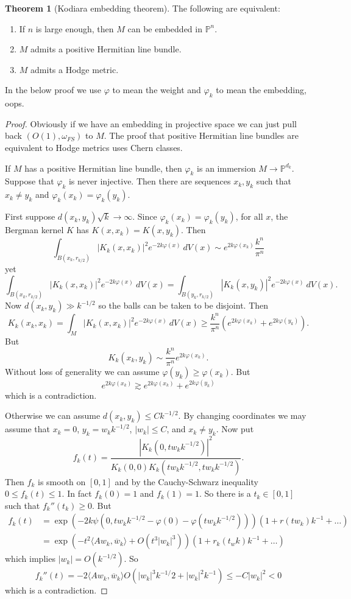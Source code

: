 \documentclass[12pt]{report}
\newcommand{\PP}{\mathbb{P}}
\theoremstyle{definition}
\newtheorem{theorem}{Theorem}[chapter]
\begin{document}
\begin{theorem}[Kodiara embedding theorem]
    The following are equivalent:
\begin{enumerate}
    \item If $n$ is large enough, then $M$ can be embedded in $\PP^n$.
    \item $M$ admits a positive Hermitian line bundle.
    \item $M$ admits a Hodge metric.
\end{enumerate}
\end{theorem}
    In the below proof we use $\varphi$ to mean the weight and $\varphi_k$ to mean the embedding, oops.
\begin{proof}
    Obviously if we have an embedding in projective space we can just pull back $(O(1), \omega_{FS})$ to $M$. The proof that positive Hermitian line bundles are equivalent to Hodge metrics uses Chern classes.

    If $M$ has a positive Hermitian line bundle, then $\varphi_k$ is an immersion $M \to \PP^{d_k}$. Suppose that $\varphi_k$ is never injective. Then there are sequences $x_k,y_k$ such that $x_k \neq y_k$ and $\varphi_k(x_k) = \varphi_k(y_k)$.

    First suppose $d(x_k, y_k)\sqrt k \to \infty$. Since $\varphi_k(x_k) = \varphi_k(y_k)$, for all $x$, the Bergman kernel $K$ has $K(x, x_k) = K(x, y_k)$. Then
$$\int_{B(x_k, r_{k/2})} |K_k(x, x_k)|^2 e^{-2k\varphi(x)} ~dV(x) \sim e^{2k\varphi(x_k)} \frac{k^n}{\pi^n}$$
yet
$$\int_{B(x_k, r_{k/2})} |K_k(x, x_k)|^2 e^{-2k\varphi(x)} ~dV(x) = \int_{B(y_k, r_{k/2})} |K_k(x, y_k)|^2 e^{-2k\varphi(x)} ~dV(x).$$
    Now $d(x_k, y_k) \gg k^{-1/2}$ so the balls can be taken to be disjoint. Then
    $$K_k(x_k, x_k) = \int_M |K_k(x, x_k)|^2 e^{-2k\varphi(x)} ~dV(x) \geq \frac{k^n}{\pi^n}(e^{2k\varphi(x_k)} + e^{2k\varphi(y_k)}).$$
    But
    $$K_k(x_k, y_k) \sim \frac{k^n}{\pi^n} e^{2k\varphi(x_k)}.$$
    Without loss of generality we can assume $\varphi(y_k) \geq \varphi(x_k)$. But
    $$e^{2k\varphi(x_k)} \gtrsim e^{2k\varphi(x_k)} + e^{2k\varphi(y_k)}$$
    which is a contradiction.

    Otherwise we can assume $d(x_k, y_k) \leq Ck^{-1/2}$. By changing coordinates we may assume that $x_k = 0$, $y_k = w_kk^{-1/2}$, $|w_k| \leq C$, and $x_k \neq y_k$. Now put
    $$f_k(t) = \frac{|K_k(0, tw_kk^{-1/2})|^2}{K_k(0, 0)K_k(tw_kk^{-1/2}, tw_kk^{-1/2})}.$$
    Then $f_k$ is smooth on $[0, 1]$ and by the Cauchy-Schwarz inequality $0 \leq f_k(t) \leq 1$. In fact $f_k(0) = 1$ and $f_k(1) = 1$. So there is a $t_k \in [0, 1]$ such that $f_k''(t_k) \geq 0$. But
\begin{align*}
    f_k(t) &= \exp(-2k\psi(0, tw_kk^{-1/2} - \varphi(0) - \varphi(tw_kk^{-1/2})))(1 + r(tw_k)k^{-1} + \dots)\\
        &= \exp(-t^2\langle Aw_k, \overline w_k\rangle + O(t^3|w_k|^3))(1 + r_k(t_wk)k^{-1} + \dots)
\end{align*}
    which implies $|w_k| = O(k^{-1/2})$.
    So
    $$f_k''(t) = -2\langle Aw_k, \overline w_k\rangle O(|w_k|^3k^{-1/}2 + |w_k|^2k^{-1}) \leq -C|w_k|^2 < 0$$
    which is a contradiction.
\end{proof}
\end{document}
